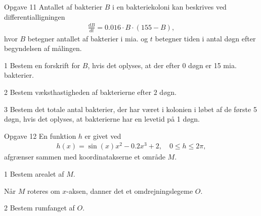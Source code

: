 \begin{opgavetekst}{Opgave 11}
	Antallet af bakterier $B$ i en bakteriekoloni kan beskrives ved differentialligningen
	\begin{align*}
		\frac{dB}{dt} = 0.016\cdot B\cdot (155 - B),
	\end{align*}
	hvor $B$ betegner antallet af bakterier i mia. og $t$ betegner tiden i antal døgn efter begyndelsen af målingen.
\end{opgavetekst}
\begin{delopgave}{1}
	Bestem en forskrift for $B$, hvis det oplyses, at der efter $0$ døgn er 15 mia. bakterier. 
\end{delopgave}
\begin{delopgave}{2}
	Bestem væksthastigheden af bakterierne efter $2$ døgn. 
\end{delopgave}
\begin{delopgave}{3}
	Bestem det totale antal bakterier, der har været i kolonien i løbet af de første 5 døgn, hvis det oplyses, at bakterierne har en levetid på 1 døgn.
\end{delopgave}
%
%
%
%
%
\begin{opgavetekst}{Opgave 12}
	En funktion $h$ er givet ved 
	\begin{align*}
		h(x) = \sin(x)x^2 - 0.2x^3 + 2, \quad  0 \leq h \leq 2\pi,
	\end{align*}
	afgrænser sammen med koordinatakserne et område $M$.
\end{opgavetekst}	
\begin{delopgave}{1}
	Bestem arealet af $M$. 
\end{delopgave}
\begin{meretekst}
	Når $M$ roteres om $x$-aksen, danner det et omdrejningslegeme $O$.
\end{meretekst}
\begin{delopgave}{2}
	Bestem rumfanget af $O$. 
\end{delopgave}